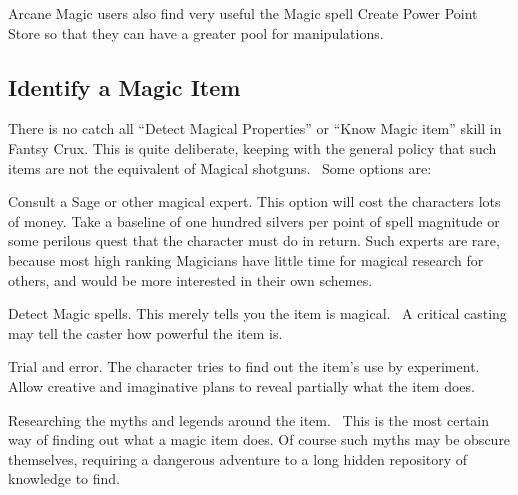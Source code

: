 Arcane Magic users also find very useful the Magic spell Create Power Point Store so that they can have a greater pool for manipulations.

\subsection{Identify a Magic Item}
There is no catch all “Detect Magical Properties” or “Know Magic item” skill in Fantsy Crux. This is quite deliberate, keeping with the general policy that such items are not the equivalent of Magical shotguns.  Some options are:

Consult a Sage or other magical expert. This option will cost the characters lots of money. Take a baseline of one hundred silvers per point of spell magnitude or some perilous quest that the character must do in return. Such experts are rare, because most high ranking Magicians have little time for magical research for others, and would be more interested in their own schemes. 

Detect Magic spells. This merely tells you the item is magical.  A critical casting may tell the caster how powerful the item is.

Trial and error. The character tries to find out the item’s use by experiment. Allow creative and imaginative plans to reveal partially what the item does.

Researching the myths and legends around the item.  This is the most certain way of finding out what a magic item does. Of course such myths may be obscure themselves, requiring a dangerous adventure to a long hidden repository of knowledge to find.

